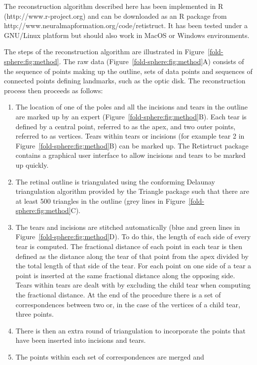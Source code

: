 \documentclass[10pt]{article}
\begin{document}
The reconstruction algorithm described here has been implemented in R
(http://www.r-project.org) and can be downloaded as an R package from
http://www.neuralmapformation.org/code/retistruct. It has been tested
under a GNU/Linux platform but should also work in MacOS or Windows
environments.

The steps of the reconstruction algorithm are illustrated in
Figure~\ref{fold-sphere:fig:method}. The raw data
(Figure~\ref{fold-sphere:fig:method}A) consists of the sequence of
points making up the outline, sets of data points and sequences of
connected points defining landmarks, such as the optic disk. The
reconstruction process then proceeds as follows:
\begin{enumerate}
\item The location of one of the poles and all the incisions and tears
  in the outline are marked up by an expert
  (Figure~\ref{fold-sphere:fig:method}B). Each tear is defined by a
  central point, referred to as the apex, and two outer points,
  referred to as vertices.  Tears within tears or incisions (for
  example tear 2 in Figure~\ref{fold-sphere:fig:method}B) can be
  marked up. The Retistruct package contains a graphical user
  interface to allow incisions and tears to be marked up quickly.
\item The retinal outline is triangulated using the conforming
  Delaunay triangulation algorithm provided by the Triangle package
  \cite{Shew96tria} such that there are at least 500 triangles in
  the outline (grey lines in Figure~\ref{fold-sphere:fig:method}C).
\item The tears and incisions are stitched automatically (blue and
  green lines in Figure~\ref{fold-sphere:fig:method}D). To do this,
  the length of each side of every tear is computed. The fractional
  distance of each point in each tear is then defined as the distance
  along the tear of that point from the apex divided by the total
  length of that side of the tear. For each point on one side of a
  tear a point is inserted at the same fractional distance along the
  opposing side. Tears within tears are dealt with by excluding the
  child tear when computing the fractional distance. At the end of the
  procedure there is a set of correspondences between two or, in the
  case of the vertices of a child tear, three points.
\item There is then an extra round of triangulation to incorporate the
  points that have been inserted into incisions and tears.
\item The points within each set of correspondences are merged and

\end{enumerate}
\end{document}
